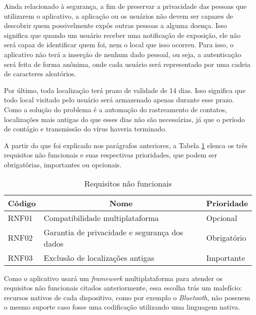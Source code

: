 Ainda relacionado à segurança, a fim de preservar a privacidade das pessoas que utilizarem o aplicativo, a aplicação ou os usuários não devem ser capazes de descobrir quem possivelmente expôs outras pessoas a alguma doença. Isso significa que quando um usuário receber uma notificação de exposição, ele não será capaz de identificar quem foi, nem o local que isso ocorreu. Para isso, o aplicativo não terá a inserção de nenhum dado pessoal, ou seja, a autenticação será feita de forma anônima, onde cada usuário será representado por uma cadeia de caracteres aleatórios.

Por último, toda localização terá prazo de validade de 14 dias. Isso significa que todo local visitado pelo usuário será armazenado apenas durante esse prazo. Como a solução do problema é a automação do rastreamento de contatos, localizações mais antigas do que esses dias não são necessárias, já que o período de contágio e transmissão do vírus haveria terminado.

A partir do que foi explicado nos parágrafos anteriores, a Tabela \ref{tab:tabelanf} elenca os três requisitos não funcionais e suas respectivas prioridades, que podem ser obrigatórias, importantes ou opcionais.

\begin{table}[!htb]
\caption[Tabela de requisitos não funcionais]{Requisitos não funcionais}
\label{tab:tabelanf}
\begin{center}
\begin{tabular}{|l|l|l|}
\hline
\multicolumn{1}{|c|}{\textbf{Código}} & \multicolumn{1}{c|}{\textbf{Nome}}            & \multicolumn{1}{c|}{\textbf{Prioridade}} \\ \hline
RNF01                                 & Compatibilidade multiplataforma               & Opcional                                 \\ \hline
RNF02                                 & Garantia de privacidade e segurança dos dados & Obrigatório                              \\ \hline
RNF03                                 & Exclusão de localizações antigas              & Importante                               \\ \hline
\end{tabular}
\end{center}
\end{table}

Como o aplicativo usará um \textit{framework} multiplataforma para atender os requisitos não funcionais citados anteriormente, essa escolha trás um malefício: recursos nativos de cada dispositivo, como por exemplo o \textit{Bluetooth}, não possuem o mesmo suporte caso fosse uma codificação utilizando uma linguagem nativa.

